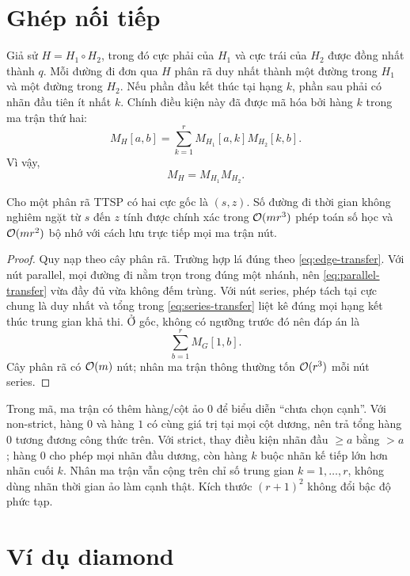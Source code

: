 \section{Ghép nối tiếp}

Giả sử $H=H_1\circ H_2$, trong đó cực phải của $H_1$ và cực trái của $H_2$ được đồng nhất thành $q$. Mỗi đường đi đơn qua $H$ phân rã duy nhất thành một đường trong $H_1$ và một đường trong $H_2$. Nếu phần đầu kết thúc tại hạng $k$, phần sau phải có nhãn đầu tiên ít nhất $k$. Chính điều kiện này đã được mã hóa bởi hàng $k$ trong ma trận thứ hai:
\begin{equation}
\label{eq:series-transfer}
  M_H[a,b]=\sum_{k=1}^r M_{H_1}[a,k]M_{H_2}[k,b].
\end{equation}
Vì vậy,
\[
  M_H=M_{H_1}M_{H_2}.
\]

\begin{theorem}
Cho một phân rã TTSP có hai cực gốc là $(s,z)$. Số đường đi thời gian không nghiêm ngặt từ $s$ đến $z$ tính được chính xác trong $\mathcal{O}(mr^3)$ phép toán số học và $\mathcal{O}(mr^2)$ bộ nhớ với cách lưu trực tiếp mọi ma trận nút.
\end{theorem}

\begin{proof}
Quy nạp theo cây phân rã. Trường hợp lá đúng theo \cref{eq:edge-transfer}. Với nút parallel, mọi đường đi nằm trọn trong đúng một nhánh, nên \cref{eq:parallel-transfer} vừa đầy đủ vừa không đếm trùng. Với nút series, phép tách tại cực chung là duy nhất và tổng trong \cref{eq:series-transfer} liệt kê đúng mọi hạng kết thúc trung gian khả thi. Ở gốc, không có ngưỡng trước đó nên đáp án là
\[
  \sum_{b=1}^r M_G[1,b].
\]
Cây phân rã có $\mathcal{O}(m)$ nút; nhân ma trận thông thường tốn $\mathcal{O}(r^3)$ mỗi nút series.
\end{proof}

Trong mã, ma trận có thêm hàng/cột ảo $0$ để biểu diễn ``chưa chọn cạnh''. Với non-strict, hàng $0$ và hàng $1$ có cùng giá trị tại mọi cột dương, nên trả tổng hàng $0$ tương đương công thức trên. Với strict, thay điều kiện nhãn đầu $\ge a$ bằng $>a$; hàng $0$ cho phép mọi nhãn đầu dương, còn hàng $k$ buộc nhãn kế tiếp lớn hơn nhãn cuối $k$. Nhân ma trận vẫn cộng trên chỉ số trung gian $k=1,\ldots,r$, không dùng nhãn thời gian ảo làm cạnh thật. Kích thước $(r+1)^2$ không đổi bậc độ phức tạp.

\section{Ví dụ diamond}


